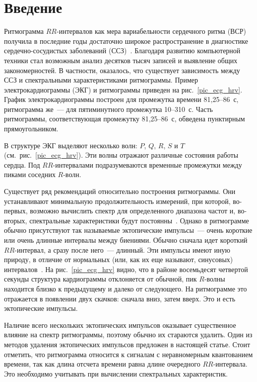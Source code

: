       \begin{multicols}{2}

      \label{st\stat}

\section{Введение}

Ритмограмма $RR$-интервалов как мера вариабельности сердечного
ритма (ВСР) получила в\linebreak
 последние годы достаточно широкое
распространение в диагностике сердечно-сосудистых заболеваний
(ССЗ)~\cite{1ma, 2ma}. Благодаря развитию компью\-терной техники стал
возможным анализ десятков тысяч записей и выявление общих
закономер\-ностей. В частности, оказалось, что существует\linebreak
зависимость между ССЗ и спектральными характеристиками
ритмограммы. Пример электрокардиограммы (ЭКГ) и ритмограммы
приведен на рис.~\ref{pic_ecg_hrv}. График электрокардиограммы
построен для промежутка времени 81,25--86~с, ритмограмма же~---
для пятиминутного промежутка 10--310~с. Часть ритмограммы,
соответствующая промежутку 81,25--86~с, обведена пунктирным
прямоугольником.


В структуре ЭКГ выделяют несколько волн: $P$, $Q$, $R$, $S$ и $T$
(см.\ рис.~\ref{pic_ecg_hrv}). Эти волны отражают различные
состояния работы сердца. Под $RR$-ин\-тер\-ва\-ла\-ми подразумеваются
временные промежутки между пиками соседних $R$-волн.

Существует ряд рекомендаций относительно построения ритмограммы.
Они устанавливают минимальную продолжительность измерений, при
которой, во-первых, возможно вычислить спектр для определенного
диапазона частот и, во-вторых, спектральные характеристики будут
постоянны~\cite{1ma}. Однако в ритмограмме обычно присутствуют так
называемые эктопические импульсы~--- очень короткие или очень
длинные интервалы между биениями. Обычно сначала идет короткий
$RR$-интервал, а сразу после него~--- длинный. Эти импульсы имеют
иную природу, в отличие от нормальных (или, как их еще называют,
синусовых) интервалов~\cite{1ma, 3ma}. На рис.~\ref{pic_ecg_hrv} видно,
что в районе восемьдесят четвертой секунды структура кардиограммы
отклоняется от обычной, пик $R$-волны находится близко к
предыду\-ще\-му и далеко от следующего. На ритмограмме это отражается
в появлении двух скачков: сначала вниз, затем вверх. Это и есть
эктопические им\-пульсы.

Наличие всего нескольких эктопических импульсов оказывает
существенное влияние на спектр ритмограммы, поэтому обычно их
стараются удалить. Один из методов удаления эктопических импульсов
предложен в настоящей статье. Стоит отметить, что ритмограмма
относится к сигналам с неравномерным квантованием времени, так как
длина отсчета времени равна длине очередного $RR$-интервала. Это
необходимо учитывать при вычислении спектральных характеристик.


\end{multicols}
